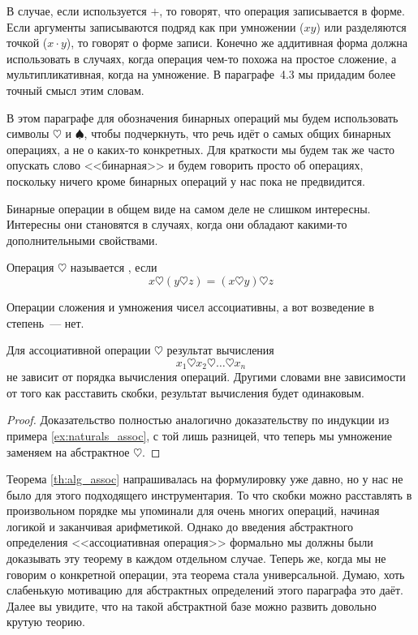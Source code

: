В случае, если используется $+$, то говорят, что операция записывается в  форме. Если аргументы записываются подряд как при умножении ($xy$) или разделяются точкой ($x\cdot y$), то говорят о  форме записи. Конечно же аддитивная форма должна использовать в случаях, когда операция чем-то похожа на простое сложение, а мультипликативная, когда на умножение. В параграфе~4.3 мы придадим более точный смысл этим словам.

В этом параграфе для обозначения бинарных операций мы будем использовать символы $\heartsuit$ и $\spadesuit$, чтобы подчеркнуть, что речь идёт о самых общих бинарных операциях, а не о каких-то конкретных. Для краткости мы будем так же часто опускать слово <<бинарная>> и будем говорить просто об операциях, поскольку ничего кроме бинарных операций у нас пока не предвидится.

Бинарные операции в общем виде на самом деле не слишком интересны. Интересны они становятся в случаях, когда они обладают какими-то дополнительными свойствами.

\begin{definition}
Операция $\heartsuit$ называется , если
$$x\heartsuit(y\heartsuit z) = (x\heartsuit y)\heartsuit z$$
\end{definition}

\begin{example}
Операции сложения и умножения чисел ассоциативны, а вот возведение в степень~--- нет.
\end{example}

\begin{thm}\label{th:alg_assoc}
Для ассоциативной операции $\heartsuit$ результат вычисления
$$x_1\heartsuit x_2\heartsuit\ldots\heartsuit x_n$$
не зависит от порядка вычисления операций. Другими словами вне зависимости от того как расставить скобки, результат вычисления будет одинаковым.
\end{thm}
\begin{proof}
Доказательство полностью аналогично доказательству по индукции из примера \ref{ex:naturals_assoc}, с той лишь разницей, что теперь мы умножение заменяем на абстрактное $\heartsuit$.
\end{proof}

Теорема \ref{th:alg_assoc} напрашивалась на формулировку уже давно, но у нас не было для этого подходящего инструментария. То что скобки можно расставлять в произвольном порядке мы упоминали для очень многих операций, начиная логикой и заканчивая арифметикой. Однако до введения абстрактного определения <<ассоциативная операция>> формально мы должны были доказывать эту теорему в каждом отдельном случае. Теперь же, когда мы не говорим о конкретной операции, эта теорема стала универсальной. Думаю, хоть слабенькую мотивацию для абстрактных определений этого параграфа это даёт. Далее вы увидите, что на такой абстрактной базе можно развить довольно крутую теорию.

